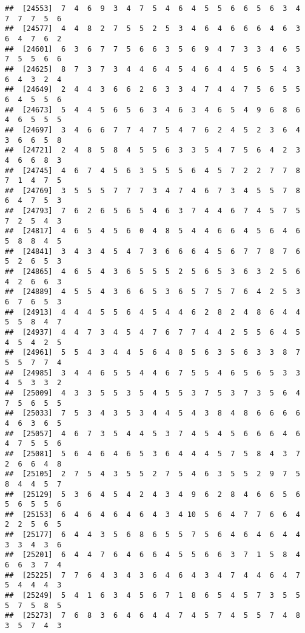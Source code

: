 \documentclass[
]{book}
\begin{document}
\begin{verbatim}
##  [24553]  7  4  6  9  3  4  7  5  4  6  4  5  5  6  6  5  6  3  4  7  7  7  5  6
##  [24577]  4  4  8  2  7  5  5  2  5  3  4  6  4  6  6  6  4  6  3  6  4  7  6  2
##  [24601]  6  3  6  7  7  5  6  6  3  5  6  9  4  7  3  3  4  6  5  7  5  5  6  6
##  [24625]  8  7  3  7  3  4  4  6  4  5  4  6  4  4  5  6  5  4  3  6  4  3  2  4
##  [24649]  2  4  4  3  6  6  2  6  3  3  4  7  4  4  7  5  6  5  5  6  4  5  5  6
##  [24673]  5  4  4  5  6  5  6  3  4  6  3  4  6  5  4  9  6  8  6  4  6  5  5  5
##  [24697]  3  4  6  6  7  7  4  7  5  4  7  6  2  4  5  2  3  6  4  3  6  6  5  8
##  [24721]  2  4  8  5  8  4  5  5  6  3  3  5  4  7  5  6  4  2  3  4  6  6  8  3
##  [24745]  4  6  7  4  5  6  3  5  5  5  6  4  5  7  2  2  7  7  8  7  1  4  7  5
##  [24769]  3  5  5  5  7  7  7  3  4  7  4  6  7  3  4  5  5  7  8  6  4  7  5  3
##  [24793]  7  6  2  6  5  6  5  4  6  3  7  4  4  6  7  4  5  7  5  7  2  5  4  3
##  [24817]  4  6  5  4  5  6  0  4  8  5  4  4  6  6  4  5  6  4  6  5  8  8  4  5
##  [24841]  3  4  3  4  5  4  7  3  6  6  6  4  5  6  7  7  8  7  6  5  2  6  5  3
##  [24865]  4  6  5  4  3  6  5  5  5  2  5  6  5  3  6  3  2  5  6  4  2  6  6  3
##  [24889]  4  5  5  4  3  6  6  5  3  6  5  7  5  7  6  4  2  5  3  6  7  6  5  3
##  [24913]  4  4  4  5  5  6  4  5  4  4  6  2  8  2  4  8  6  4  4  5  5  8  4  7
##  [24937]  4  4  7  3  4  5  4  7  6  7  7  4  4  2  5  5  6  4  5  4  5  4  2  5
##  [24961]  5  5  4  3  4  4  5  6  4  8  5  6  3  5  6  3  3  8  7  5  5  7  7  4
##  [24985]  3  4  4  6  5  5  4  4  6  7  5  5  4  6  5  6  5  3  3  4  5  3  3  2
##  [25009]  4  3  3  5  5  3  5  4  5  5  3  7  5  3  7  3  5  6  4  7  5  6  5  5
##  [25033]  7  5  3  4  3  5  3  4  4  5  4  3  8  4  8  6  6  6  6  4  6  3  6  5
##  [25057]  4  6  7  3  5  4  4  5  3  7  4  5  4  5  6  6  6  4  6  4  7  5  5  6
##  [25081]  5  6  4  6  4  6  5  3  6  4  4  4  5  7  5  8  4  3  7  2  6  6  4  8
##  [25105]  2  7  5  4  3  5  5  2  7  5  4  6  3  5  5  2  9  7  5  8  4  4  5  7
##  [25129]  5  3  6  4  5  4  2  4  3  4  9  6  2  8  4  6  6  5  6  5  6  5  5  6
##  [25153]  6  4  6  4  6  4  6  4  3  4 10  5  6  4  7  7  6  6  4  2  2  5  6  5
##  [25177]  6  4  4  3  5  6  8  6  5  5  7  5  6  4  6  4  6  4  4  3  3  4  3  6
##  [25201]  6  4  4  7  6  4  6  6  4  5  5  6  6  3  7  1  5  8  4  6  6  3  7  4
##  [25225]  7  7  6  4  3  4  3  6  4  6  4  3  4  7  4  4  6  4  7  5  4  4  4  3
##  [25249]  5  4  1  6  3  4  5  6  7  1  8  6  5  4  5  7  3  5  5  5  7  5  8  5
##  [25273]  7  6  8  3  6  4  6  4  4  7  4  5  7  4  5  5  7  4  8  3  5  7  4  3

\end{verbatim}
\end{document}
